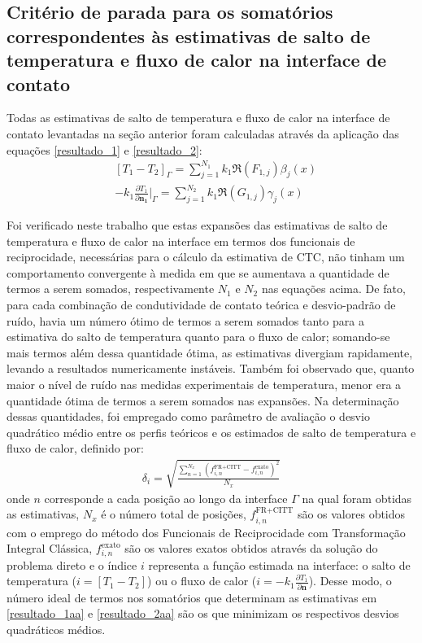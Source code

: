 \subsection{Critério de parada para os somatórios correspondentes às estimativas de salto de temperatura e fluxo de calor na interface de contato}

Todas as estimativas de salto de temperatura e fluxo de calor na interface de contato levantadas na seção anterior foram calculadas através da aplicação das equações \eqref{resultado_1} e \eqref{resultado_2}:
\begin{align}
& [T_1 - T_2]_\Gamma = \sum_{j=1}^{N_1} k_1 \Re(F_{1,j}) \beta_j(x)\label{resultado_1aa}  \\
& - k_1 \frac{\partial T_1}{\partial\mathbf{n_1}}\bigg|_\Gamma = \sum_{j=1}^{N_2} k_1 \Re(G_{1,j}) \gamma_j(x)\label{resultado_2aa}
\end{align}

Foi verificado neste trabalho que estas expansões das estimativas de salto de temperatura e fluxo de calor na interface em termos dos funcionais de reciprocidade, necessárias para o cálculo da estimativa de CTC, não tinham um comportamento convergente à medida em que se aumentava a quantidade de termos a serem somados, respectivamente $N_1$ e $N_2$ nas equações acima. De fato, para cada combinação de condutividade de contato teórica e desvio-padrão de ruído, havia um número ótimo de termos a serem somados tanto para a estimativa do salto de temperatura quanto para o fluxo de calor; somando-se mais termos além dessa quantidade ótima, as estimativas divergiam rapidamente, levando a resultados numericamente instáveis. Também foi observado que, quanto maior o nível de ruído nas medidas experimentais de temperatura, menor era a quantidade ótima de termos a serem somados nas expansões. Na determinação dessas quantidades, foi empregado como parâmetro de avaliação o desvio quadrático médio entre os perfis teóricos e os estimados de salto de temperatura e fluxo de calor, definido por:
\begin{align}
\delta_i = \sqrt{\frac{\sum_{n=1}^{N_x} \left(f^{\text{FR}+\text{CITT}}_{i,n} - f_{i,n}^{\text{exato}}\right)^2 }{N_x}}
\end{align}
onde $n$ corresponde a cada posição ao longo da interface $\Gamma$ na qual foram obtidas as estimativas, $N_x$ é o número total de posições, $f^{\text{FR}+\text{CITT}}_{i,n}$ são os valores obtidos com o emprego do método dos Funcionais de Reciprocidade com Transformação Integral Clássica, $f_{i,n}^{\text{exato}}$ são os valores exatos obtidos através da solução do problema direto e o índice $i$ representa a função estimada na interface: o salto de temperatura ($i = [T_1 - T_2]$) ou o fluxo de calor ($i = -k_1 \frac{\partial T_1}{\partial \mathbf{n}}$). Desse modo, o número ideal de termos nos somatórios que determinam as estimativas em \eqref{resultado_1aa} e \eqref{resultado_2aa} são os que minimizam os respectivos desvios quadráticos médios.

